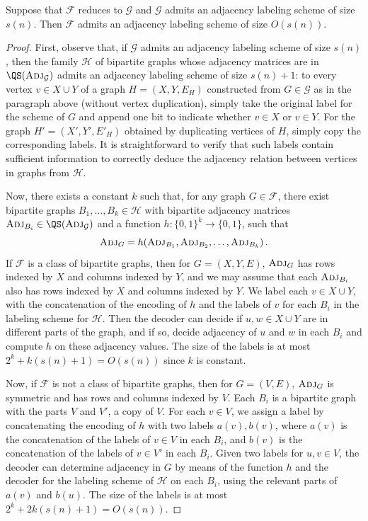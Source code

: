\documentclass{theoretics}
\newcommand{\zo}{\{0,1\}}
\newcommand{\cF}{\ensuremath{\mathcal{F}}}
\newcommand{\cG}{\ensuremath{\mathcal{G}}}
\newcommand{\cH}{\ensuremath{\mathcal{H}}}
\newcommand{\Adj}{\textsc{Adj}}
\begin{document}
\begin{proposition}
Suppose that $\cF$ reduces to $\cG$ and $\cG$ admits an adjacency labeling scheme of size $s(n)$.
Then $\cF$ admits an adjacency labeling scheme of size $O(s(n))$.
\end{proposition}
\begin{proof}
First, observe that, if $\cG$ admits an adjacency labeling scheme of size $s(n)$, then the family
$\cH$ of bipartite graphs whose adjacency matrices are in $\QS(\Adj_\cG)$ admits an adjacency labeling
scheme of size $s(n) + 1$: to every vertex $v \in X \cup Y$ of a graph $H = (X, Y, E_H)$ constructed
from $G \in \cG$ as in the paragraph above (without vertex duplication), simply take the original label
for the scheme of $G$ and append one bit to indicate whether $v \in X$ or $v \in Y$. For the graph
$H' = (X',Y',E'_H)$ obtained by duplicating vertices of $H$, simply copy the corresponding labels. It is
straightforward to verify that such labels contain sufficient information to correctly deduce the adjacency 
relation between vertices in graphs from $\cH$.

Now, there exists a constant $k$ such that, for any graph $G \in \cF$, there exist bipartite graphs
$B_1, \dotsc, B_k \in \cH$ with bipartite adjacency matrices $\Adj_{B_i} \in \QS(\Adj_\cG)$ and a
function $h : \zo^k \to \zo$, such that
\[
  \Adj_G = h(\Adj_{B_1}, \Adj_{B_2}, \dotsc, \Adj_{B_k}) \,.
\]
If $\cF$ is a class of bipartite graphs, then for $G = (X,Y,E)$, $\Adj_G$ has rows indexed by $X$ and columns indexed by $Y$, and we may assume that each $\Adj_{B_i}$ also
has rows indexed by $X$ and columns indexed by $Y$. We label each $v \in X \cup Y$, with the
concatenation of the encoding of $h$ and the labels of $v$ for each $B_i$ in the labeling scheme for
$\cH$.  Then the decoder can decide if $u,w \in X \cup Y$ are in different parts of the graph, and
if so, decide adjacency of $u$ and $w$ in each $B_i$ and compute $h$ on these adjacency values. The
size of the labels is at most $2^k + k(s(n)+1) = O(s(n))$ since $k$ is constant.

Now, if $\cF$ is not a class of bipartite graphs, then for $G = (V,E)$, $\Adj_G$ is symmetric and has
rows and columns indexed by $V$. Each $B_i$ is a bipartite graph with the parts $V$ and
$V'$, a copy of $V$. For each $v \in V$, we assign a label by concatenating the encoding of $h$ with two labels $a(v), b(v)$, where $a(v)$ is the concatenation of the labels of $v \in V$ in each $B_i$, and $b(v)$ is the concatenation of the labels of $v \in V'$ in each $B_i$. 
Given two labels for $u,v \in V$, the decoder can determine adjacency in $G$
by means of the function $h$ and the decoder for the labeling scheme of $\cH$ on each $B_i$, using the relevant parts of $a(v)$ and $b(u)$. The size of the labels is at most $2^k + 2k(s(n)+1)= O(s(n))$.
\end{proof}
\end{document}
